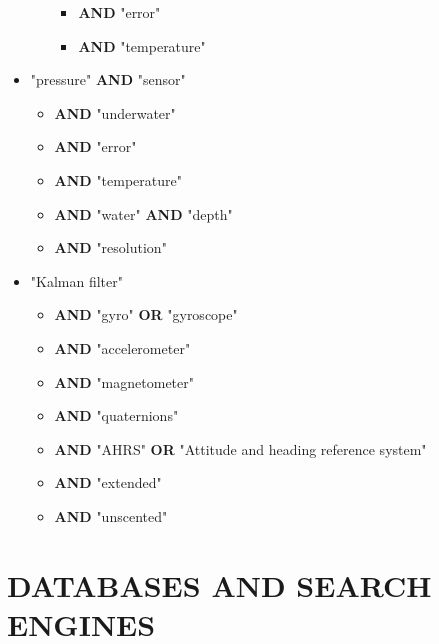 \begin{itemize}
\begin{itemize}
		\begin{itemize}
			\item {\sffamily\bfseries\textcolor{RoyalRed}{AND}} "error"
			\item {\sffamily\bfseries\textcolor{RoyalRed}{AND}} "temperature"
		\end{itemize}
	\end{itemize}
	\item "pressure" {\sffamily\bfseries\textcolor{RoyalRed}{AND}} "sensor"
	\begin{itemize}
		\item {\sffamily\bfseries\textcolor{RoyalRed}{AND}} "underwater"
		\item {\sffamily\bfseries\textcolor{RoyalRed}{AND}} "error"
		\item {\sffamily\bfseries\textcolor{RoyalRed}{AND}} "temperature"
		\item {\sffamily\bfseries\textcolor{RoyalRed}{AND}} "water" {\sffamily\bfseries\textcolor{RoyalRed}{AND}} "depth"
		\item {\sffamily\bfseries\textcolor{RoyalRed}{AND}} "resolution"
	\end{itemize}
	\item "Kalman filter"
	\begin{itemize}
		\item {\sffamily\bfseries\textcolor{RoyalRed}{AND}} "gyro" {\sffamily\bfseries\textcolor{RoyalRed}{OR}} "gyroscope"
		\item {\sffamily\bfseries\textcolor{RoyalRed}{AND}} "accelerometer"
		\item {\sffamily\bfseries\textcolor{RoyalRed}{AND}} "magnetometer"
		\item {\sffamily\bfseries\textcolor{RoyalRed}{AND}} "quaternions"
		\item {\sffamily\bfseries\textcolor{RoyalRed}{AND}} "AHRS" {\sffamily\bfseries\textcolor{RoyalRed}{OR}} "Attitude and heading reference system"
		\item {\sffamily\bfseries\textcolor{RoyalRed}{AND}} "extended"
		\item {\sffamily\bfseries\textcolor{RoyalRed}{AND}} "unscented"
	\end{itemize}
\end{itemize}

\section*{DATABASES AND SEARCH ENGINES}

